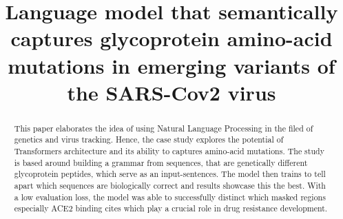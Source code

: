 \documentclass[conference,compsoc]{IEEEtran}
\begin{document}
%
\title{Language model that semantically captures glycoprotein amino-acid \\ mutations in emerging variants of the SARS-Cov2 virus}


\author{
\and
{}
}

\maketitle

\begin{abstract}
This paper elaborates the idea of using Natural Language Processing in the filed of genetics and virus tracking. Hence, the case study explores the potential of Transformers architecture and its ability to captures amino-acid mutations. The study is based around building a grammar from sequences, that are genetically different glycoprotein peptides, which serve as an input-sentences.  The model then trains to tell apart which sequences are biologically correct and results showcase this the best. With a low evaluation loss, the model was able to successfully distinct which masked regions especially ACE2 binding cites which play a crucial role in drug resistance development. 
\end{abstract}
\end{document}
